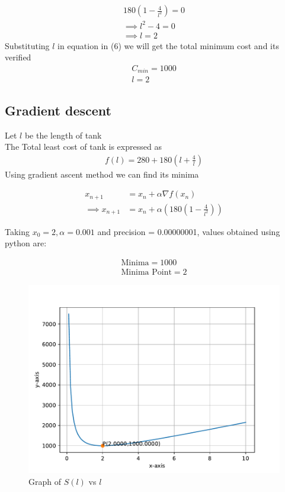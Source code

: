 \documentclass[journal,10pt,twocolumn]{article}
\providecommand{\brak}[1]{\ensuremath{\left(#1\right)}}
\begin{document}
\begin{align}
    180\brak{1-\frac{4}{l^2}}=0\\
    \implies l^2-4=0\\
    \implies l=2
\end{align}
Substituting $l$ in equation in (6) we will get the total minimum cost and its verified 
\begin{align}
	\boxed{C_{min} = 1000}\\
	\boxed{l = 2}
\end{align}

\subsection*{\normalsize Gradient descent}
Let $l$ be the length of tank \\ \vspace{1mm}
The Total least cost of tank is expressed as
\begin{align}
	\label{eq:vol_varx}
	f(l) = 280 + 180\brak{l+\frac{4}{l}}
\end{align}
Using gradient ascent method we can find its minima\\ \vspace{2mm}

    \begin{align}
        x_{n+1} &= x_n + \alpha \nabla f(x_n) \\
        \implies x_{n+1} &= x_n + \alpha \brak{180\brak{1-\frac{4}{l^2}}}
    \end{align}
    
Taking $x_0=2,\alpha=0.001$ and precision = 0.00000001, values obtained using python are:
    
    \begin{align}
        \boxed{\text{Minima} = 1000}\\
        \boxed{\text{Minima Point} = 2}
    \end{align}

\begin{figure}[t]
	\centering
	\includegraphics[width=1\columnwidth]{opt.pdf}
	\caption{Graph of $S(l)$ vs $l$}
	\label{fig:graph_fx}
\end{figure}
\end{document}

